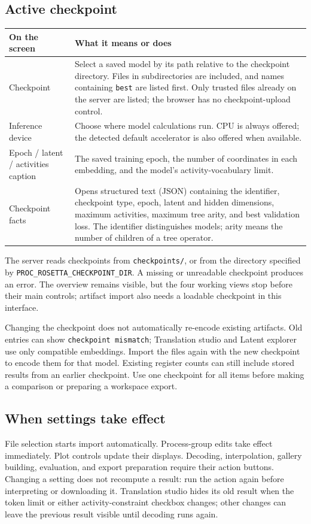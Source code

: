\documentclass[11pt,a4paper]{article}
\makeatletter
\newcommand{\code}[1]{\nolinkurl{#1}}
\newenvironment{controls}{%
  \small\begin{longtable}{@{}>{\raggedright\arraybackslash}p{.34\linewidth}
    >{\raggedright\arraybackslash}p{.62\linewidth}@{}}
  \toprule\textbf{On the screen} & \textbf{What it means or does}\\\midrule\endhead
  \bottomrule\endfoot
}{\end{longtable}\normalsize}
\makeatother
\begin{document}
\subsection{Active checkpoint}
\begin{controls}
Checkpoint & Select a saved model by its path relative to the checkpoint
directory. Files in subdirectories are included, and names containing
\code{best} are listed first. Only trusted files already on the server are
listed; the browser has no checkpoint-upload control.\\
Inference device & Choose where model calculations run. CPU is always offered;
the detected default accelerator is also offered when available.\\
Epoch / latent / activities caption & The saved training epoch, the number of
coordinates in each embedding, and the model's activity-vocabulary limit.\\
Checkpoint facts & Opens structured text (JSON) containing the identifier,
checkpoint type, epoch, latent and hidden dimensions, maximum activities,
maximum tree arity, and best validation loss. The identifier distinguishes
models; arity means the number of children of a tree operator.\\
\end{controls}

The server reads checkpoints from \code{checkpoints/}, or from the directory
specified by \code{PROC_ROSETTA_CHECKPOINT_DIR}. A missing or unreadable
checkpoint produces an error. The overview remains visible, but the four
working views stop before their main controls; artifact import also needs a
loadable checkpoint in this interface.

Changing the checkpoint does not automatically re-encode existing artifacts.
Old entries can show \code{checkpoint mismatch}; Translation studio and Latent
explorer use only compatible embeddings. Import the files again with the new
checkpoint to encode them for that model. Existing register counts can still
include stored results from an earlier checkpoint. Use one checkpoint for all
items before making a comparison or preparing a workspace export.

\subsection{When settings take effect}
File selection starts import automatically. Process-group edits take effect
immediately. Plot controls update their displays. Decoding, interpolation,
gallery building, evaluation, and export preparation require their action
buttons. Changing a setting does not recompute a result: run the action again
before interpreting or downloading it. Translation studio hides its old result
when the token limit or either activity-constraint checkbox changes; other
changes can leave the previous result visible until decoding runs again.
\end{document}
